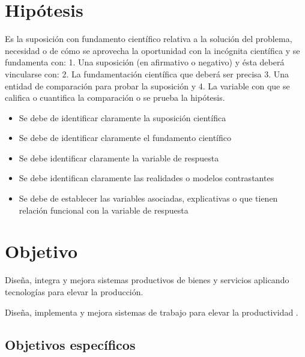     \section{Hipótesis}
    
    Es la suposición con fundamento científico relativa a la solución del problema, necesidad o de cómo se aprovecha la oportunidad con la incógnita científica y se fundamenta con: 1. Una suposición (en afirmativo o negativo) y ésta deberá vincularse con:
    2. La fundamentación científica que deberá ser precisa 3. Una entidad de comparación para probar la suposición y
    4. La variable con que se califica o cuantifica la comparación o se prueba la hipótesis.
    
    \begin{itemize}
        \item Se debe de identificar claramente la suposición científica
        \item Se debe de identificar claramente el fundamento científico
        \item Se debe identificar claramente la variable de respuesta
        \item Se debe identifican claramente las realidades o modelos contrastantes
        \item Se debe de establecer las variables asociadas, explicativas o que tienen relación funcional con la variable de respuesta
    \end{itemize}
    \section{Objetivo}
        Diseña, integra y mejora sistemas productivos de bienes y servicios aplicando tecnologías para elevar la producción. 
        
        Diseña, implementa y mejora sistemas de trabajo para elevar la productividad .
    
    \subsection{Objetivos específicos }
    
